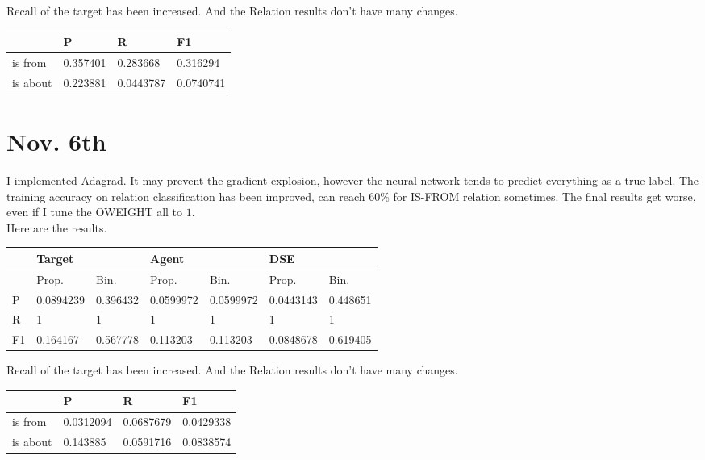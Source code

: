 \documentclass[a4paper, 12pt]{article}
\begin{document}
Recall of the target has been increased.
And the Relation results don't have many changes.
\begin{table}[h!]
\centering
\begin{tabular}{l|l|l|l}
\hline
         & P & R & F1    \\\hline
is from  & 0.357401& 0.283668& 0.316294 \\
is about & 0.223881& 0.0443787& 0.0740741\\
\hline
\end{tabular}
\end{table}

\section{Nov. 6th}

I implemented Adagrad. It may prevent the gradient explosion, however the neural network tends 
to predict everything as a true label. The training accuracy on relation classification has been improved, can reach 60\% for IS-FROM relation sometimes. The final results get worse, even if 
I tune the OWEIGHT all to $1$.\\
Here are the results.
\begin{table}[h!]
\centering
\begin{tabular}{l|ll|ll|ll}
\hline
   & \multicolumn{2}{l}{Target} & \multicolumn{2}{l}{Agent} & \multicolumn{2}{l}{DSE} \\ \hline
   & Prop.& Bin.& Prop.& Bin.& Prop.& Bin.\\
 \hline
P  &0.0894239&0.396432 &0.0599972 & 0.0599972 &0.0443143 & 0.448651  \\
R  &        1&       1 &        1 &         1 &        1 &        1  \\
F1 & 0.164167&0.567778 & 0.113203 &  0.113203 &0.0848678 & 0.619405  \\ \hline
\end{tabular}
\end{table}

Recall of the target has been increased.
And the Relation results don't have many changes.
\begin{table}[h!]
\centering
\begin{tabular}{l|l|l|l}
\hline
         & P & R & F1    \\\hline
is from  & 0.0312094& 0.0687679& 0.0429338\\
is about & 0.143885& 0.0591716& 0.0838574\\
\hline
\end{tabular}
\end{table}
\end{document}
